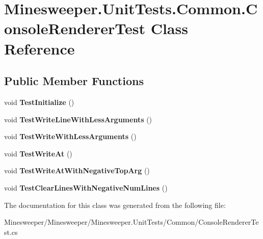 \hypertarget{class_minesweeper_1_1_unit_tests_1_1_common_1_1_console_renderer_test}{\section{Minesweeper.\+Unit\+Tests.\+Common.\+Console\+Renderer\+Test Class Reference}
\label{class_minesweeper_1_1_unit_tests_1_1_common_1_1_console_renderer_test}
}
\subsection*{Public Member Functions}
\begin{DoxyCompactItemize}
\item 
\hypertarget{class_minesweeper_1_1_unit_tests_1_1_common_1_1_console_renderer_test_ae400a34092f5897283275527dcba8d1b}{void {\bfseries Test\+Initialize} ()}\label{class_minesweeper_1_1_unit_tests_1_1_common_1_1_console_renderer_test_ae400a34092f5897283275527dcba8d1b}

\item 
\hypertarget{class_minesweeper_1_1_unit_tests_1_1_common_1_1_console_renderer_test_aa1eca05cdd8550ecc35c8e07cb720ea9}{void {\bfseries Test\+Write\+Line\+With\+Less\+Arguments} ()}\label{class_minesweeper_1_1_unit_tests_1_1_common_1_1_console_renderer_test_aa1eca05cdd8550ecc35c8e07cb720ea9}

\item 
\hypertarget{class_minesweeper_1_1_unit_tests_1_1_common_1_1_console_renderer_test_abcbb2509dbdcdcf3de75ba153dbcbb3c}{void {\bfseries Test\+Write\+With\+Less\+Arguments} ()}\label{class_minesweeper_1_1_unit_tests_1_1_common_1_1_console_renderer_test_abcbb2509dbdcdcf3de75ba153dbcbb3c}

\item 
\hypertarget{class_minesweeper_1_1_unit_tests_1_1_common_1_1_console_renderer_test_a610ce7f3a2c9916dfd9dcc55598b839e}{void {\bfseries Test\+Write\+At} ()}\label{class_minesweeper_1_1_unit_tests_1_1_common_1_1_console_renderer_test_a610ce7f3a2c9916dfd9dcc55598b839e}

\item 
\hypertarget{class_minesweeper_1_1_unit_tests_1_1_common_1_1_console_renderer_test_a6536d14d88124671940f16360b30d815}{void {\bfseries Test\+Write\+At\+With\+Negative\+Top\+Arg} ()}\label{class_minesweeper_1_1_unit_tests_1_1_common_1_1_console_renderer_test_a6536d14d88124671940f16360b30d815}

\item 
\hypertarget{class_minesweeper_1_1_unit_tests_1_1_common_1_1_console_renderer_test_a71a2717ed0b284bbe1008e730079b824}{void {\bfseries Test\+Clear\+Lines\+With\+Negative\+Num\+Lines} ()}\label{class_minesweeper_1_1_unit_tests_1_1_common_1_1_console_renderer_test_a71a2717ed0b284bbe1008e730079b824}

\end{DoxyCompactItemize}


The documentation for this class was generated from the following file\+:\begin{DoxyCompactItemize}
\item 
Minesweeper/\+Minesweeper/\+Minesweeper.\+Unit\+Tests/\+Common/Console\+Renderer\+Test.\+cs\end{DoxyCompactItemize}
